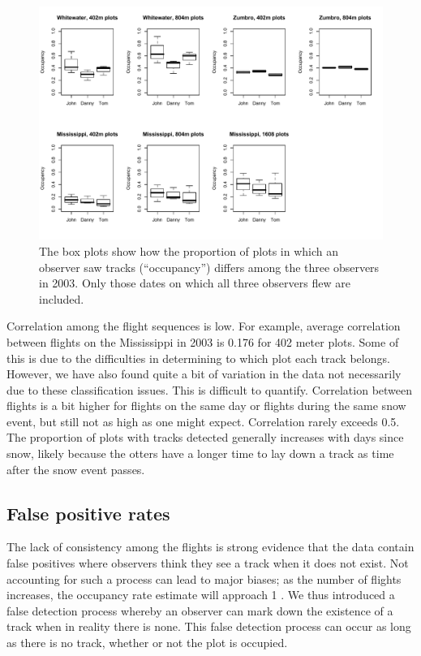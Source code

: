 \documentclass[12pt]{article}
\begin{document}
    \begin{figure}
        \centering
        \includegraphics[width=5in]{observerPlots.pdf}
        \caption{The box plots show how the proportion of plots in which an
        observer saw tracks (``occupancy'') differs among the three observers in
        2003. Only those dates on which all three observers flew are included.}
        \label{obsPlots}
    \end{figure}

    Correlation among the flight sequences is low. For example, average
    correlation between flights on the Mississippi in 2003 is 0.176 for 402
    meter plots. Some of this is due to the difficulties in determining to which
    plot each track belongs. However, we have also found quite a bit of
    variation in the data not necessarily due to these classification issues.
    This is difficult to quantify. Correlation between flights is a bit higher
    for
    flights on the same day or flights during the same snow event, but still not
    as high as one might expect. Correlation rarely exceeds 0.5. The proportion
    of plots with tracks detected
    generally increases with days since snow, likely because the otters have a
    longer time to lay down a track as time after the snow event passes.

    \subsection{False positive rates}
    The lack of consistency among the flights is strong evidence that the data
    contain false positives where observers think they see a track when it does
    not exist. Not accounting for such a process can lead to major biases; as
    the number of flights increases, the occupancy rate estimate will approach
    1 \cite{Royle2006}. We thus introduced a false detection process whereby an 
    observer
    can mark down the existence of a track when in reality there is none. This
    false detection process can occur as long as there is no track, whether or
    not the plot is occupied.
\end{document}
